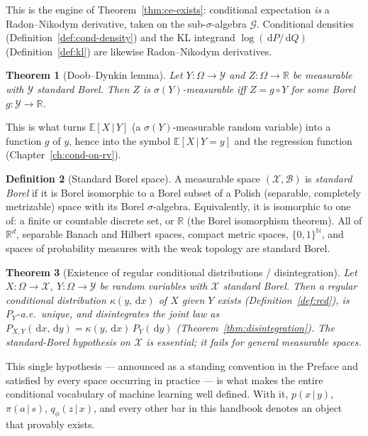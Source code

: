 \documentclass[11pt,oneside]{report}
\theoremstyle{plain}
\newtheorem{theorem}{Theorem}[chapter]
\theoremstyle{definition}
\newtheorem{definition}[theorem]{Definition}
\theoremstyle{remark}
\newcommand{\R}{\mathbb{R}}
\newcommand{\N}{\mathbb{N}}
\newcommand{\E}{\mathbb{E}}
\newcommand{\dd}{\,\mathrm{d}}
\newcommand{\Gcal}{\mathcal{G}}
\newcommand{\Bcal}{\mathcal{B}}
\newcommand{\Xcal}{\mathcal{X}}
\newcommand{\Ycal}{\mathcal{Y}}
\newcommand{\given}{\,\vert\,}
\numberwithin{equation}{chapter}
\begin{document}
This is the engine of Theorem~\ref{thm:ce-exists}: conditional expectation
\emph{is} a Radon--Nikodym derivative, taken on the sub-$\sigma$-algebra
$\Gcal$. Conditional densities (Definition~\ref{def:cond-density}) and the
KL integrand $\log(\dd P/\dd Q)$ (Definition~\ref{def:kl}) are likewise
Radon--Nikodym derivatives.

\begin{theorem}[Doob--Dynkin lemma]\label{thm:dd-app}
Let $Y:\Omega\to\Ycal$ and $Z:\Omega\to\R$ be measurable with $\Ycal$
standard Borel. Then $Z$ is $\sigma(Y)$-measurable iff $Z=g\circ Y$ for some
Borel $g:\Ycal\to\R$.
\end{theorem}

This is what turns $\E[X\given Y]$ (a $\sigma(Y)$-measurable random
variable) into a function $g$ of $y$, hence into the symbol $\E[X\given
Y=y]$ and the regression function (Chapter~\ref{ch:cond-on-rv}).

\begin{definition}[Standard Borel space]\label{def:std-borel}
A measurable space $(\Xcal,\Bcal)$ is \emph{standard Borel} if it is Borel
isomorphic to a Borel subset of a Polish (separable, completely
metrizable) space with its Borel $\sigma$-algebra. Equivalently, it is
isomorphic to one of: a finite or countable discrete set, or $\R$ (the
Borel isomorphism theorem). All of $\R^d$, separable Banach and Hilbert
spaces, compact metric spaces, $\{0,1\}^\N$, and spaces of probability
measures with the weak topology are standard Borel.
\end{definition}

\begin{theorem}[Existence of regular conditional distributions / disintegration]
\label{thm:disint-app}
Let $X:\Omega\to\Xcal$, $Y:\Omega\to\Ycal$ be random variables with $\Xcal$
standard Borel. Then a regular conditional distribution $\kappa(y,\dd x)$ of
$X$ given $Y$ exists (Definition~\ref{def:rcd}), is $P_Y$-a.e.\ unique, and
disintegrates the joint law as
$P_{X,Y}(\dd x,\dd y)=\kappa(y,\dd x)\,P_Y(\dd y)$
(Theorem~\ref{thm:disintegration}). The standard-Borel hypothesis on
$\Xcal$ is essential; it fails for general measurable spaces.
\end{theorem}

This single hypothesis --- announced as a standing convention in the
Preface and satisfied by every space occurring in practice --- is what makes
the entire conditional vocabulary of machine learning well defined. With it,
$p(x\given y)$, $\pi(a\given s)$, $q_\phi(z\given x)$, and every other bar
in this handbook denotes an object that provably exists.
\end{document}
